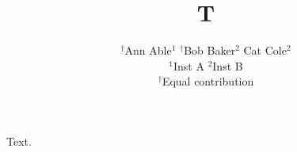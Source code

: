 \documentclass{article}
\begin{document}
\title{T}
\author{$^{\dagger}$Ann Able$^{1}$ \quad $^{\dagger}$Bob Baker$^{2}$ \quad Cat Cole$^{2}$\\
$^1$Inst A $^2$Inst B\\
$^\dagger$Equal contribution}
\maketitle
Text.
\end{document}
